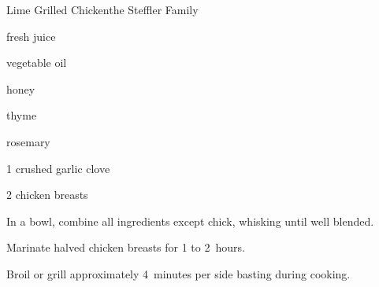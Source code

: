 \begin{recipe}{Lime Grilled Chicken}{the Steffler Family}{}

\begin{ingredients}
\item \C{\half} fresh  juice
\item \C{\quarter} vegetable oil
\item {} honey
\item {} thyme
\item {} rosemary
\item 1 crushed garlic clove
\item 2 chicken breasts
\end{ingredients}

\begin{directions}
\item In a bowl, combine all ingredients except chick, whisking until well blended.
\item Marinate halved chicken breasts for 1 to 2~hours.
\item Broil or grill approximately 4~minutes per side basting during cooking.
\end{directions}
\end{recipe}
